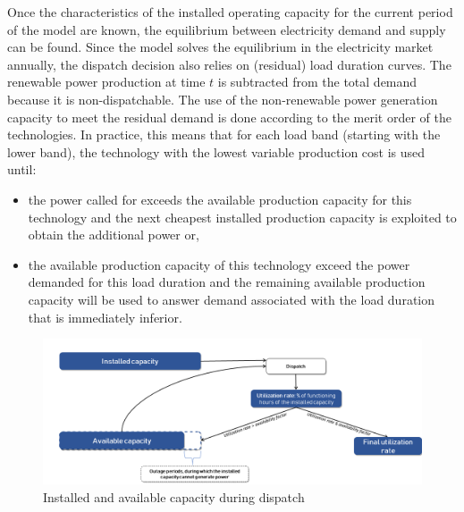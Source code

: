 

Once the characteristics of the installed operating capacity for the current period of the model are known, the equilibrium between electricity demand and supply can be found.
Since the model solves the equilibrium in the electricity market annually, the dispatch decision also relies on (residual) load duration curves. The renewable power production at time $t$ is subtracted from the total demand because it is non-dispatchable.
The use of the non-renewable power generation capacity to meet the residual demand is done according to the merit order of the technologies.
In practice, this means that for each load band (starting with the lower band), the technology with the lowest variable production cost is used until:


\begin{itemize}
    \item the power called for exceeds the available production capacity for this technology and the next cheapest installed production capacity is exploited to obtain the additional power or,
    \item the available production capacity of this technology exceed the power demanded for this load duration and the remaining available production capacity will be used to answer demand associated with the load duration that is immediately inferior.
\end{itemize}

\begin{figure}[H]
    \centerline{\includegraphics[scale=0.6]{figures&tables/availb.png}}
    \caption{Installed and available capacity during dispatch}
    \label{fig:avail}
\end{figure}


